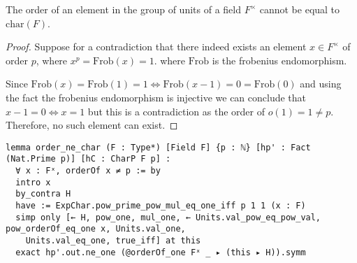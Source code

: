 \begin{lemma}
  \label{order_ne_char}
  \leanok
  The order of an element in the group of units of a field $F^\times$ cannot be equal to $\textrm{char}(F)$.
\end{lemma}
\begin{proof}
\leanok
Suppose for a contradiction that there indeed exists an element $x \in F^\times$ of order $p$, where $x^p = \textrm{Frob}(x) = 1$. where $\textrm{Frob}$
is the frobenius endomorphism.

Since $\textrm{Frob}(x) = \textrm{Frob}(1) = 1 \iff \textrm{Frob}(x - 1) = 0 = \textrm{Frob}(0)$ and using the fact the frobenius endomorphism is injective
we can conclude that $x - 1 = 0 \iff x = 1$ but this is a contradiction as the order of $o(1) = 1 \ne p$. Therefore, no such element can exist.
\end{proof}
\begin{footnotesize}
\begin{verbatim}
lemma order_ne_char (F : Type*) [Field F] {p : ℕ} [hp' : Fact (Nat.Prime p)] [hC : CharP F p] :
  ∀ x : Fˣ, orderOf x ≠ p := by
  intro x
  by_contra H
  have := ExpChar.pow_prime_pow_mul_eq_one_iff p 1 1 (x : F)
  simp only [← H, pow_one, mul_one, ← Units.val_pow_eq_pow_val, pow_orderOf_eq_one x, Units.val_one,
    Units.val_eq_one, true_iff] at this
  exact hp'.out.ne_one (@orderOf_one Fˣ _ ▸ (this ▸ H)).symm
\end{verbatim}
\end{footnotesize}

